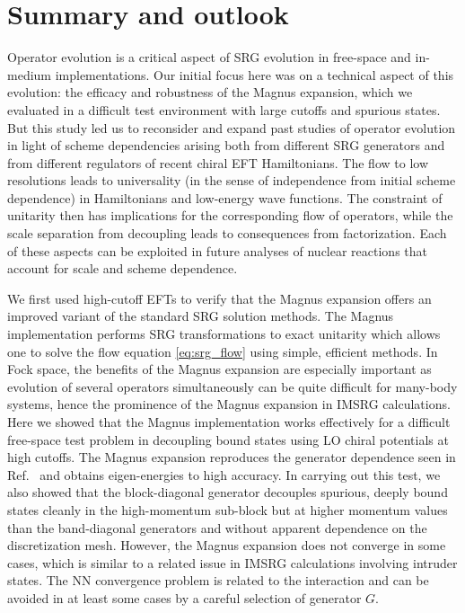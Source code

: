 \documentclass[10pt,aps,prc,floatfix,twocolumn,nofootinbib]{revtex4-1}
\begin{document}
\section{Summary and outlook}
\label{sec:summary}


Operator evolution is a critical aspect of SRG evolution in free-space and in-medium implementations.
Our initial focus here was on a technical aspect of this evolution: the efficacy and robustness of the Magnus expansion, which we evaluated in a difficult test environment with large cutoffs and spurious states.
But this study led us to reconsider and expand past studies of operator evolution in light of scheme dependencies arising both from different SRG generators and from different regulators of recent chiral EFT Hamiltonians.
The flow to low resolutions leads to universality (in the sense of independence from initial scheme dependence) in Hamiltonians and low-energy wave functions.
The constraint of unitarity then has implications for the corresponding flow of operators, while the scale separation from decoupling leads to consequences from factorization.
Each of these aspects can be exploited in future analyses of nuclear reactions that account for scale and scheme dependence.


We first used high-cutoff EFTs to verify that the Magnus expansion offers an improved variant of the standard SRG solution methods.
The Magnus implementation performs SRG transformations to exact unitarity which allows one to solve the flow equation \eqref{eq:srg_flow} using simple, efficient methods.
In Fock space, the benefits of the Magnus expansion are especially important as evolution of several operators simultaneously can be quite difficult for many-body systems, hence the prominence of the Magnus expansion in IMSRG calculations.
Here we showed that the Magnus implementation works effectively for a difficult free-space test problem in decoupling bound states using LO chiral potentials at high cutoffs.
The Magnus expansion reproduces the generator dependence seen in Ref.~\cite{Wendt:2011qj} and obtains eigen-energies to high accuracy.
In carrying out this test, we also showed that the block-diagonal generator decouples spurious, deeply bound states cleanly in the high-momentum sub-block but at higher momentum values than the band-diagonal generators and without apparent dependence on the discretization mesh.
However, the Magnus expansion does not converge in some cases, which is similar to a related issue in IMSRG calculations involving intruder states.
The NN convergence problem is related to the interaction and can be avoided in at least some cases by a careful selection of generator $G$.
\end{document}
